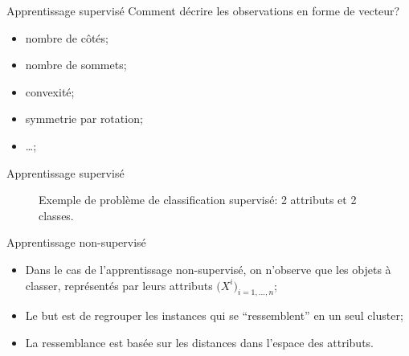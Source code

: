 \documentclass[8pt]{beamer}
\begin{document}
			\begin{frame}{Apprentissage supervisé}
				Comment décrire les observations en forme de vecteur?
				\begin{itemize}
					\item<2-> nombre de côtés;
					\item<3-> nombre de sommets;
					\item<4-> convexité;
					\item<5-> symmetrie par rotation;
					\item<6-> \dots;
				\end{itemize}
			\end{frame}

			\begin{frame}{Apprentissage supervisé}
				\begin{figure}[H]
					\begin{center}
						
						\caption*{\tiny Exemple de problème de classification supervisé: 2 attributs et 2 classes.}
					\end{center}
				\end{figure}
			\end{frame}

			\begin{frame}{Apprentissage non-supervisé}
				\begin{itemize}
					\item<1-> Dans le cas de l'apprentissage non-supervisé, on n'observe que les objets à classer, représentés par leurs attributs \(\big(X^i\big)_{i=1,\dots, n}\);
					\item<2-> Le but est de regrouper les instances qui se ``ressemblent'' en un seul cluster;
					\item<3-> La ressemblance est basée sur les distances dans l'espace des attributs.
				\end{itemize}
			\end{frame}
\end{document}
